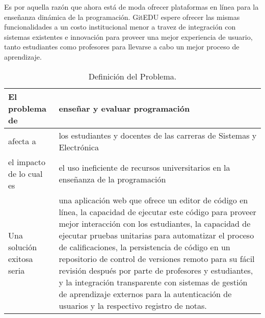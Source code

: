 Es por aquella razón que ahora está de moda ofrecer plataformas en línea para la enseñanza dinámica de la programación. GitEDU espere ofrecer las mismas funcionalidades a un costo institucional menor a travez de integración con sistemas existentes e innovación para proveer una mejor experiencia de usuario, tanto estudiantes como profesores para llevarse a cabo un mejor proceso de aprendizaje.

\begin{table}[h!]
  \begin{tabular}{|p{}|p{}|}
    \hline
    El problema de & enseñar y evaluar programación \\
    \hline
    afecta a & los estudiantes y docentes de las carreras de Sistemas y Electrónica \\
    \hline
    el impacto de lo cual es & el uso ineficiente de recursos universitarios en la enseñanza de la programación \\
    \hline
    Una solución exitosa seria & una aplicación web que ofrece un editor de código en línea, la capacidad de ejecutar este código para proveer mejor interacción con los estudiantes, la capacidad de ejecutar pruebas unitarias para automatizar el proceso de calificaciones, la persistencia de código en un repositorio de control de versiones remoto para su fácil revisión después por parte de profesores y estudiantes, y la integración transparente con sistemas de gestión de aprendizaje externos para la autenticación de usuarios y la respectivo registro de notas. \\
    \hline
  \end{tabular}
  \caption{Definición del Problema.}
  \label{def-prob}
\end{table}

